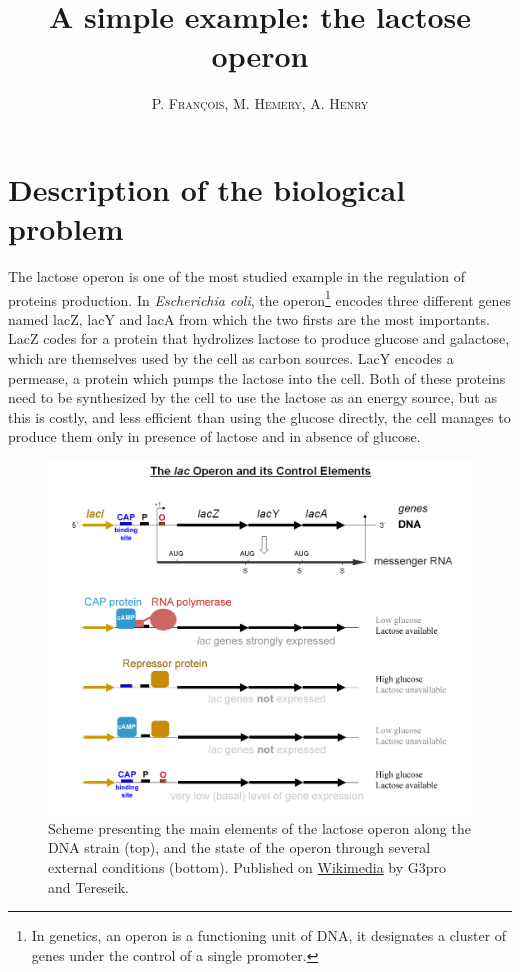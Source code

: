 \documentclass[]{article}
\title{A simple example: the lactose operon}
\author{P. \textsc{François}, M. \textsc{Hemery}, A. \textsc{Henry}}
\begin{document}
\maketitle{}

\section{Description of the biological
problem}\label{description-of-the-biological-problem}

The lactose operon is one of the most studied example in the regulation of
proteins production. In \textit{Escherichia coli}, the operon\footnote{
In genetics, an operon is a functioning unit of DNA, it designates
a cluster of genes under the control of a single promoter.} encodes three
different genes named lacZ, lacY and lacA from which the two firsts are
the most importants. LacZ codes for a protein that hydrolizes lactose
to produce glucose and galactose, which are themselves used by the cell as
carbon sources. LacY encodes a permease, a protein which pumps the
lactose into the cell. Both of these proteins need to be
synthesized by the cell to use the lactose as an energy source, but as this
is costly, and less efficient than using the glucose directly, the cell
manages to produce them only in presence of lactose and in absence of
glucose.

\begin{figure}
\centering
\includegraphics[width=.6\textwidth]{lac_operon_presentation}
\caption{Scheme presenting the main elements of the lactose operon along 
the DNA strain (top), and the state of the operon through several external 
conditions (bottom). Published on
\href{https://commons.wikimedia.org/wiki/File:Lac_operon-2010-21-01.png}{Wikimedia}
by G3pro and Tereseik.}
\label{fig:lac_operon}
\end{figure}
\end{document}
